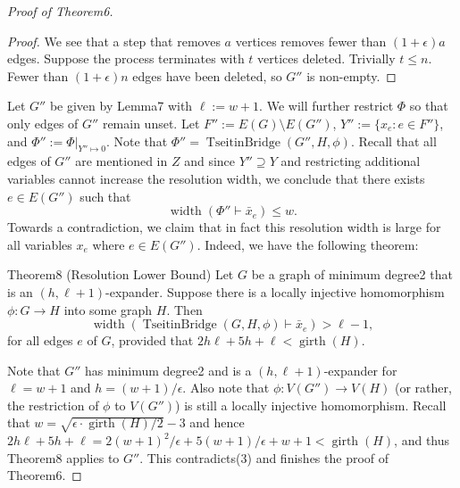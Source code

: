 \begin{proof}[Proof of Theorem6]
\begin{proof}
We see that a step that removes $a$ vertices removes fewer than $(1+\epsilon)a$ edges. Suppose the process terminates with $t$ vertices deleted. Trivially $t\le n$. Fewer than $(1+\epsilon)n$ edges have been deleted, so $G''$ is non-empty.
\end{proof}
Let $G''$ be given by Lemma7 with $\ell:=w+1$. We will further restrict $\Phi$ so that only edges of $G''$ remain unset. Let $F'':=E(G)\setminus E(G'')$, $Y'':=\{x_e:e\in F''\}$, and $\Phi'':=\Phi|_{Y''\mapsto0}$. Note that $\Phi''=\operatorname{TseitinBridge}(G'',H,\phi)$. Recall that all edges of $G''$ are mentioned in $Z$ and since $Y''\supseteq Y$ and restricting additional variables cannot increase the resolution width, we conclude that there exists $e\in E(G'')$ such that
\begin{equation}
\operatorname{width}(\Phi''\vdash\bar x_e)\le w.\tag{3}
\end{equation}
Towards a contradiction, we claim that in fact this resolution width is large for all variables $x_e$ where $e\in E(G'')$. Indeed, we have the following theorem:
\begin{authorclaim}{Theorem8 (Resolution Lower Bound)}
Let $G$ be a graph of minimum degree2 that is an $(h,\ell+1)$-expander. Suppose there is a locally injective homomorphism $\phi:G\to H$ into some graph $H$. Then
\begin{equation}
\operatorname{width}(\operatorname{TseitinBridge}(G,H,\phi)\vdash\bar x_e)>\ell-1,\tag{4}
\end{equation}
for all edges $e$ of $G$, provided that $2h\ell+5h+\ell<\operatorname{girth}(H)$.
\end{authorclaim}
Note that $G''$ has minimum degree2 and is a $(h,\ell+1)$-expander for $\ell=w+1$ and $h=(w+1)/\epsilon$. Also note that $\phi:V(G'')\to V(H)$ (or rather, the restriction of $\phi$ to $V(G'')$) is still a locally injective homomorphism. Recall that $w=\sqrt{\epsilon\cdot\operatorname{girth}(H)/2}-3$ and hence $2h\ell+5h+\ell=2(w+1)^2/\epsilon+5(w+1)/\epsilon+w+1<\operatorname{girth}(H)$, and thus Theorem8 applies to $G''$. This contradicts(3) and finishes the proof of Theorem6.
\end{proof}
